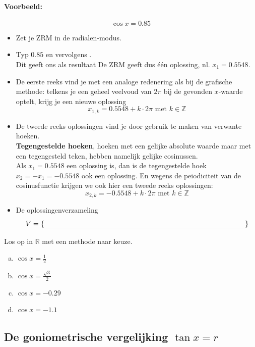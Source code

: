 \documentclass[a4paper,12pt]{article}
\begin{document}
\paragraph*{Voorbeeld:}
$$\cos x = 0.85$$
\begin{itemize}
  \item Zet je ZRM in de radialen-modus.
  \item Typ $0.85$ en vervolgens  .\\
  Dit geeft ons als resultaat \arulefill
  De ZRM geeft dus één oplossing, nl. $x_{1}=0.5548$. 
  \item De eerste reeks vind je met een analoge redenering als bij de grafische methode: telkens je een geheel veelvoud van $2\pi$ bij de gevonden $x$-waarde optelt, krijg je een nieuwe oplossing
  $$x_{1,k}=0.5548+k\cdot2\pi \mbox{ met } k \in \mathbb{Z}$$
  \item De tweede reeks oplossingen vind je door gebruik te maken van verwante hoeken.\\
  \textbf{Tegengestelde hoeken}, hoeken met een gelijke absolute waarde maar met een tegengesteld teken, hebben namelijk gelijke cosinussen.\\
  Als $x_{1}=0.5548$ een oplossing is, dan is de tegengestelde hoek $x_2=-x_1=-0.5548$ ook een oplossing. En wegens de peiodiciteit van de cosinusfunctie krijgen we ook hier een tweede reeks oplossingen:\\
  $$x_{2,k}=-0.5548+k\cdot 2\pi \mbox{ met } k \in \mathbb{Z}$$
  \item De oplossingenverzameling 
  $$V = \{\arule{10cm}\}$$
\end{itemize}

\begin{oefening}
Los op in $\mathbb{R}$ met een methode naar keuze.
\begin{enumerate}[(a)]
  \item $\cos x=\frac{1}{2}$
  \item $\cos x=\frac{\sqrt{3}}{2}$
  \item $\cos x=-0.29$
  \item $\cos x=-1.1$
\end{enumerate}
\end{oefening}

\subsection{De goniometrische vergelijking $\tan x=r$}
\end{document}
